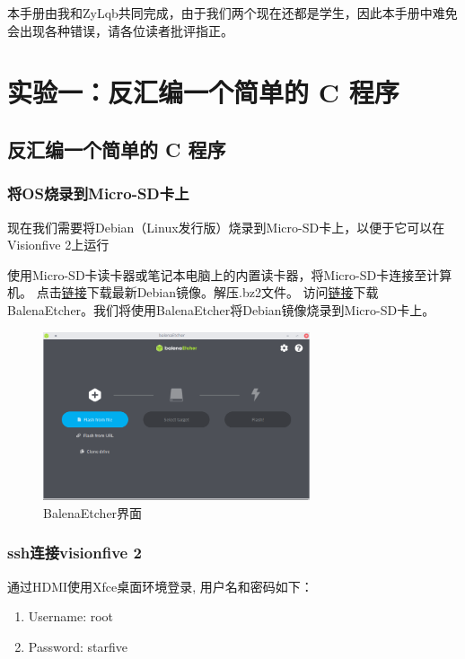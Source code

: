 \documentclass[lang=cn,10pt]{elegantbook}
\begin{document}
本手册由我和ZyLqb共同完成，由于我们两个现在还都是学生，因此本手册中难免会出现各种错误，请各位读者批评指正。

\tableofcontents

\mainmatter

\chapter{实验一：反汇编一个简单的 C 程序}

\section{反汇编一个简单的 C 程序}
\subsection{将OS烧录到Micro-SD卡上}
现在我们需要将Debian（Linux发行版）烧录到Micro-SD卡上，以便于它可以在Visionfive 2上运行

使用Micro-SD卡读卡器或笔记本电脑上的内置读卡器，将Micro-SD卡连接至计算机。
点击\href{https://debian.starfivetech.com/}{链接}下载最新Debian镜像。解压.bz2文件。 访问\href{https://www.balena.io/etcher/}{链接}下载BalenaEtcher。我们将使用BalenaEtcher将Debian镜像烧录到Micro-SD卡上。


\begin{figure}[htbp]
  \centering
  \includegraphics[width=0.7\textwidth]{image/image-20231015121217662.png}
  \caption{BalenaEtcher界面}
\end{figure}


\subsection{ssh连接visionfive 2}

通过HDMI使用Xfce桌面环境登录, 用户名和密码如下：
\begin{enumerate}
\item Username: root
\item Password: starfive
\end{enumerate}
\end{document}
